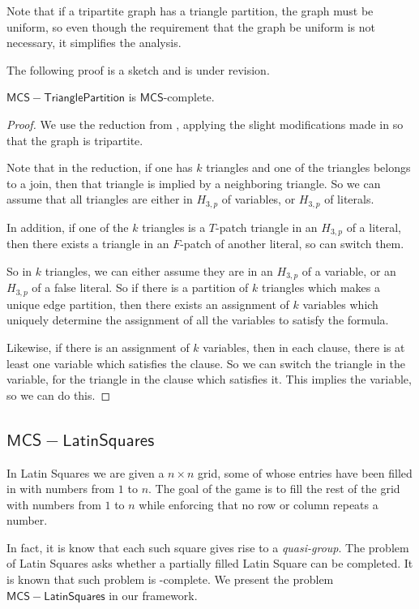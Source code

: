 \documentclass[runningheads,a4paper]{llncs}
\begin{document}
\begin{definition}
Note that if a tripartite graph has a triangle partition, the graph must be uniform, so even though the requirement that the graph be uniform is not necessary, it simplifies the analysis.

The following proof is a sketch and is under revision.

\begin{theorem}
$\mathsf{MCS-Triangle Partition}$ is $\mathsf{MCS}$-complete.
\end{theorem}

\begin{proof}
We use the reduction from \cite{holyer1981np}, applying the slight modifications made in \cite{colbourn1984complexity} so that the graph is tripartite. 

Note that in the reduction, if one has $k$ triangles and one of the triangles belongs to a join, then that triangle is implied by a neighboring triangle. So we can assume that all triangles are either in $H_{3,p}$ of variables, or $H_{3,p}$ of literals. 

In addition, if one of the $k$ triangles is a $T$-patch triangle in an $H_{3,p}$ of a literal, then there exists a triangle in an $F$-patch of another literal, so can switch them.

So in $k$ triangles, we can either assume they are in an $H_{3,p}$ of a variable, or an $H_{3,p}$ of a false literal. So if there is a partition of $k$ triangles which makes a unique edge partition, then there exists an assignment of $k$ variables which uniquely determine the assignment of all the variables to satisfy the formula. 

Likewise, if there is an assignment of $k$ variables, then in each clause, there is at least one variable which satisfies the clause. So we can switch the triangle in the variable, for the triangle in the clause which satisfies it. This implies the variable, so we can do this.
\end{proof}

\subsection{$\mathsf{MCS-LatinSquares}$}

In Latin Squares we are given a $n \times n$ grid, some of whose entries have been filled in with numbers from $1$ to $n$. The goal of the game is to fill the rest of the grid with numbers from $1$ to $n$ while enforcing that no row or column repeats a number. 

In fact, it is know that each such square gives rise to a \emph{quasi-group}. The problem of Latin Squares asks whether a partially filled Latin Square can be completed. It is known that such problem is \NP-complete. We present the problem $\mathsf{MCS-Latin Squares}$ in our framework.


\end{definition}
\end{document}

